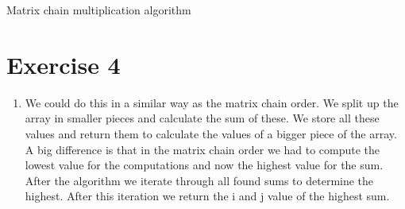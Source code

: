 \documentclass{article}
\begin{document}
\begin{algorithm}[h]
  \DontPrintSemicolon

    \caption{Matrix chain multiplication algorithm} \label{Alg:A2}
\end{algorithm}

\newpage
\section*{Exercise 4}
\begin{enumerate}[label= \alph* )]
  \item We could do this in a similar way as the matrix chain order. We split up the array in smaller pieces and calculate the sum of these. We store all these values and return them to calculate the values of a bigger piece of the array. A big difference is that in the matrix chain order we had to compute the lowest value for the computations and now the highest value for the sum. After the algorithm we iterate through all found sums to determine the highest. After this iteration we return the i and j value of the highest sum.
  \begin{algorithm}[h]
    \DontPrintSemicolon


\end{algorithm}
\end{enumerate}
\end{document}
